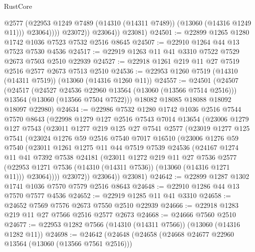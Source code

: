 \begin{lexlean}{RustCore}
\begin{coremodule}
                      @2577
                      (@22953 @1249 @7489 (@14310 (@14311 @7489)) (@13060 (@14316 @1249 @11)))
                      @23064))))
              @23072))
          @23064))
      @23081)
@24501 := @22899 @1265 @1280 @1742 @1036 @7523 @7532 @2516 @8645
@24507 := @22910 @1264 @44 @13 @7523 @7530 @4536
@24517 := @22919 @1263 @11 @41 @3310 @7522 @7529 @2673 @7503 @2510 @22939
@24527 := @22918 @1261 @219 @11 @27 @7519 @2516 @2577 @2673 @7513 @2510
@24536 := @22953 @1260 @7519 (@14310 (@14311 @7519)) (@13060 (@14316 @1260 @11))
@24557 := @24501
    (@24507
      (@24517
        (@24527 @24536 @22960 @13564 (@13060 (@13566 @7514 @2516)))
        @13564
        (@13060 (@13566 @7504 @7522)))
      @18082
      @18085
      @18088
      @18092
      @18097
      @22980)
@24634 := @22986
    @7532
    @1280
    @1742
    @1036
    @2516
    @7544
    @7570
    @8643
    (@22998
      @1279
      @127
      @2516
      @7543
      @7014
      @13654
      (@23006
        @1279
        @127
        @7543
        (@23011
          @1277
          @219
          @125
          @27
          @7541
          @2577
          (@23019
            @1277
            @125
            @7541
            (@23024
              @1276
              @59
              @2516
              @7540
              @7017
              @16510
              (@23006
                @1276
                @59
                @7540
                (@23011
                  @1261
                  @1275
                  @11
                  @44
                  @7519
                  @7539
                  @24536
                  (@24167
                    @1274
                    @11
                    @41
                    @7392
                    @7538
                    @24181
                    (@23011
                      @1272
                      @219
                      @11
                      @27
                      @7536
                      @2577
                      (@22953 @1271 @7536 (@14310 (@14311 @7536)) (@13060 (@14316 @1271 @11)))
                      @23064))))
              @23072))
          @23064))
      @23081)
@24642 := @22899 @1287 @1302 @1741 @1036 @7570 @7579 @2516 @8643
@24648 := @22910 @1286 @44 @13 @7570 @7577 @4536
@24652 := @22919 @1285 @11 @41 @3310
@24658 := @24652 @7569 @7576 @2673 @7550 @2510 @22939
@24666 := @22918 @1283 @219 @11 @27 @7566 @2516 @2577 @2673
@24668 := @24666 @7560 @2510
@24677 := @22953 @1282 @7566 (@14310 (@14311 @7566)) (@13060 (@14316 @1282 @11))
@24698 := @24642
    (@24648
      (@24658
        (@24668 @24677 @22960 @13564 (@13060 (@13566 @7561 @2516)))

\end{coremodule}
\end{lexlean}
